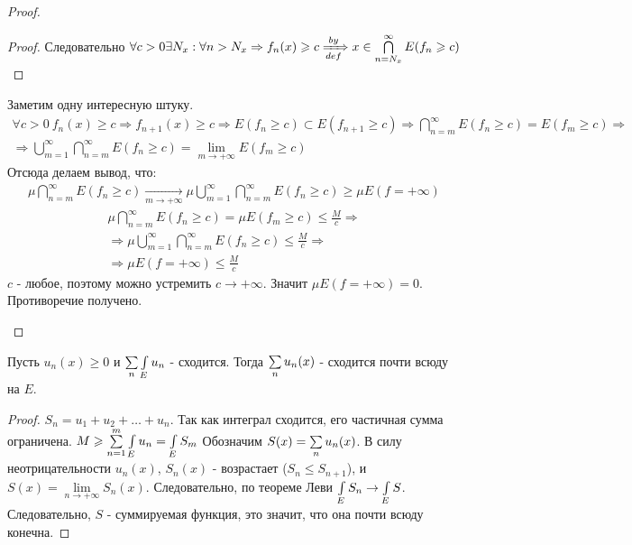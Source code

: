 \begin{proof}
\begin{enumerate}
\begin{proof}
				Следовательно $\forall c > 0 \exists N_x : \forall n > N_x \Rightarrow f_n(x) \geqslant c \xRightarrow[def]{by} 
				x \in \bigcap\limits_{n = N_x}^{\infty} E(f_n \geqslant c)$
			\end{proof}
			Заметим одну интересную штуку. 
			\begin{gather*}
				\forall c > 0\: f_n(x) \geqslant c \Rightarrow f_{n + 1}(x) \geqslant c \Rightarrow 
				E(f_n \geqslant c) \subset E(f_{n + 1} \geqslant c) \Rightarrow \bigcap\limits_{n = m}^{\infty} E(f_n \geqslant c) = E(f_m \geqslant c)
				\Rightarrow \\
				\Rightarrow \bigcup\limits_{m = 1}^{\infty} \bigcap\limits_{n = m}^{\infty} E(f_n \geqslant c) = 
				\lim\limits_{m \rightarrow +\infty} E(f_m \geqslant c)
			\end{gather*}
			Отсюда делаем вывод, что: 
			\begin{gather*}
				\mu \bigcap\limits_{n = m}^{\infty} E(f_n \geqslant c) \xrightarrow[m \rightarrow +\infty]{} 
				\mu \bigcup\limits_{m = 1}^{\infty} \bigcap\limits_{n = m}^{\infty} E(f_n \geqslant c) \geqslant
				\mu E(f = +\infty)
			\end{gather*}
			\newpage
			\begin{gather*}
				\mu \bigcap\limits_{n = m}^{\infty} E(f_n \geqslant c) = \mu E(f_m \geqslant c) \leqslant \frac{M}{c} \Rightarrow \\
				\Rightarrow \mu \bigcup\limits_{m = 1}^{\infty} \bigcap\limits_{n = m}^{\infty} E(f_n \geqslant c) \leqslant \frac{M}{c} \Rightarrow \\
				\Rightarrow \mu E(f = +\infty) \leqslant \frac{M}{c}
			\end{gather*}
			$c$ - любое, поэтому можно устремить $c \rightarrow +\infty$. Значит $\mu E(f = +\infty) = 0$. Противоречие получено.
	\end{enumerate}
\end{proof}

\begin{corollary}
	Пусть $u_n(x) \geqslant 0$ и $\sum\limits_{n}\int\limits_{E}u_n$ - сходится. Тогда $\sum\limits_{n}u_n(x)$ - сходится почти всюду на $E$.
\end{corollary}

\begin{proof}
	$S_n = u_1 + u_2 + \dots + u_n$. Так как интеграл сходится, его частичная сумма ограничена. $M \geqslant \sum\limits_{n = 1}^{m}\int\limits_{E} u_n = \int\limits_{E} S_m$		
	Обозначим $S(x) = \sum\limits_{n} u_n(x)$. В силу неотрицательности $u_n(x)$, $S_n(x)$ - возрастает ($S_n \leqslant S_{n + 1}$), и 
	$S(x) = \lim\limits_{n \rightarrow +\infty} S_n(x)$. Следовательно, по теореме Леви $\int\limits_{E} S_n \rightarrow \int\limits_{E} S$. Следовательно, $S$ - суммируемая функция, это значит, что она почти всюду конечна. 
\end{proof}

